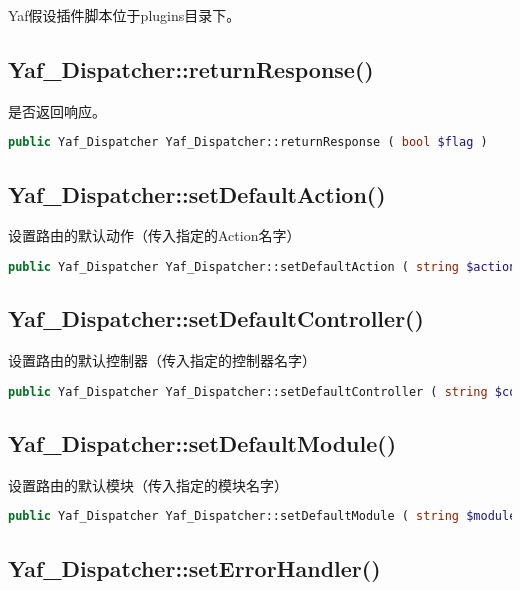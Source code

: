Yaf假设插件脚本位于plugins目录下。




\subsection{Yaf\_Dispatcher::returnResponse()}

是否返回响应。

\begin{lstlisting}[language=PHP]
public Yaf_Dispatcher Yaf_Dispatcher::returnResponse ( bool $flag )
\end{lstlisting}

\subsection{Yaf\_Dispatcher::setDefaultAction()}

设置路由的默认动作（传入指定的Action名字）

\begin{lstlisting}[language=PHP]
public Yaf_Dispatcher Yaf_Dispatcher::setDefaultAction ( string $action )
\end{lstlisting}


\subsection{Yaf\_Dispatcher::setDefaultController()}

设置路由的默认控制器（传入指定的控制器名字）

\begin{lstlisting}[language=PHP]
public Yaf_Dispatcher Yaf_Dispatcher::setDefaultController ( string $controller )
\end{lstlisting}

\subsection{Yaf\_Dispatcher::setDefaultModule()}

设置路由的默认模块（传入指定的模块名字）

\begin{lstlisting}[language=PHP]
public Yaf_Dispatcher Yaf_Dispatcher::setDefaultModule ( string $module )
\end{lstlisting}

\subsection{Yaf\_Dispatcher::setErrorHandler()}

